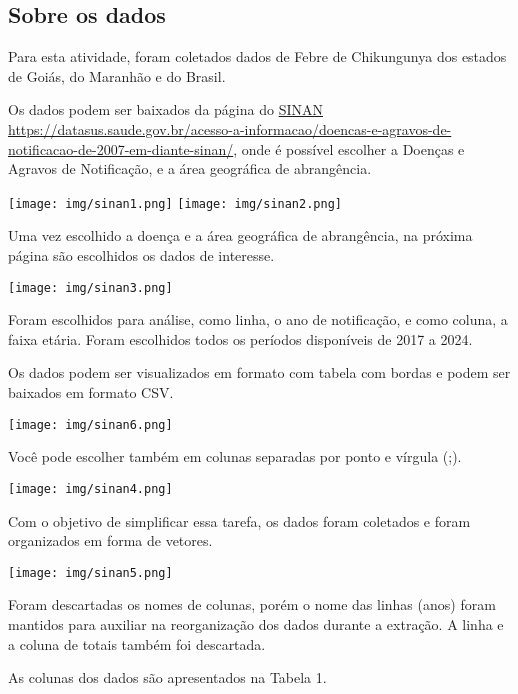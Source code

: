 \documentclass[
]{article}
\begin{document}
\subsection{Sobre os dados}\label{sobre-os-dados}

Para esta atividade, foram coletados dados de Febre de Chikungunya dos
estados de Goiás, do Maranhão e do Brasil.

Os dados podem ser baixados da página do
\href{https://datasus.saude.gov.br/acesso-a-informacao/doencas-e-agravos-de-notificacao-de-2007-em-diante-sinan/}{SINAN}
\url{https://datasus.saude.gov.br/acesso-a-informacao/doencas-e-agravos-de-notificacao-de-2007-em-diante-sinan/},
onde é possível escolher a Doenças e Agravos de Notificação, e a área
geográfica de abrangência.

\texttt{[image: img/sinan1.png]} \texttt{[image: img/sinan2.png]}

Uma vez escolhido a doença e a área geográfica de abrangência, na
próxima página são escolhidos os dados de interesse.

\texttt{[image: img/sinan3.png]}

Foram escolhidos para análise, como linha, o ano de notificação, e como
coluna, a faixa etária. Foram escolhidos todos os períodos disponíveis
de 2017 a 2024.

Os dados podem ser visualizados em formato com tabela com bordas e podem
ser baixados em formato CSV.

\texttt{[image: img/sinan6.png]}

Você pode escolher também em colunas separadas por ponto e vírgula (;).

\texttt{[image: img/sinan4.png]}

Com o objetivo de simplificar essa tarefa, os dados foram coletados e
foram organizados em forma de vetores.

\texttt{[image: img/sinan5.png]}

Foram descartadas os nomes de colunas, porém o nome das linhas (anos)
foram mantidos para auxiliar na reorganização dos dados durante a
extração. A linha e a coluna de totais também foi descartada.

As colunas dos dados são apresentados na Tabela 1.

\newpage
\end{document}
